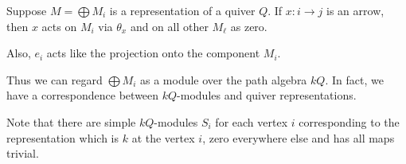 Suppose $M = \bigoplus M_i$ is a representation of a quiver $Q$. If
$x\colon i\to j$ is an arrow, then $x$ acts on $M_i$ via $\theta_x$ and
on all other $M_\ell$ as zero.

Also, $e_i$ acts like the projection onto the component $M_i$.

Thus we can regard $\bigoplus M_i$ as a module over the path algebra $kQ$. In
fact, we have a correspondence between $kQ$-modules and quiver representations.

Note that there are simple $kQ$-modules $S_i$ for each vertex $i$ corresponding to
the representation which is $k$ at the vertex $i$, zero everywhere else and has
all maps trivial.
